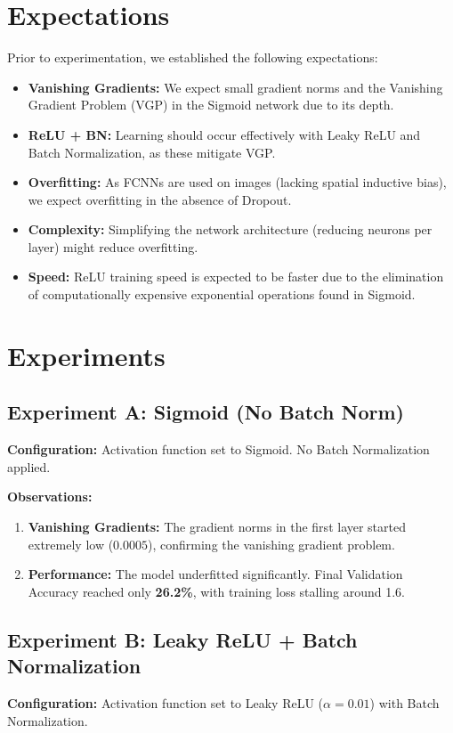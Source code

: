 \documentclass{article}
\begin{document}
\section{Expectations}
Prior to experimentation, we established the following expectations:
\begin{itemize}
    \item \textbf{Vanishing Gradients:} We expect small gradient norms and the Vanishing Gradient Problem (VGP) in the Sigmoid network due to its depth.
    \item \textbf{ReLU + BN:} Learning should occur effectively with Leaky ReLU and Batch Normalization, as these mitigate VGP.
    \item \textbf{Overfitting:} As FCNNs are used on images (lacking spatial inductive bias), we expect overfitting in the absence of Dropout.
    \item \textbf{Complexity:} Simplifying the network architecture (reducing neurons per layer) might reduce overfitting.
    \item \textbf{Speed:} ReLU training speed is expected to be faster due to the elimination of computationally expensive exponential operations found in Sigmoid.
\end{itemize}

\section{Experiments}

\subsection{Experiment A: Sigmoid (No Batch Norm)}
\textbf{Configuration:} Activation function set to Sigmoid. No Batch Normalization applied.

\textbf{Observations:}
\begin{enumerate}
    \item \textbf{Vanishing Gradients:} The gradient norms in the first layer started extremely low ($0.0005$), confirming the vanishing gradient problem.
    \item \textbf{Performance:} The model underfitted significantly. Final Validation Accuracy reached only \textbf{26.2\%}, with training loss stalling around 1.6.
\end{enumerate}

\subsection{Experiment B: Leaky ReLU + Batch Normalization}
\textbf{Configuration:} Activation function set to Leaky ReLU ($\alpha=0.01$) with Batch Normalization.
\end{document}
